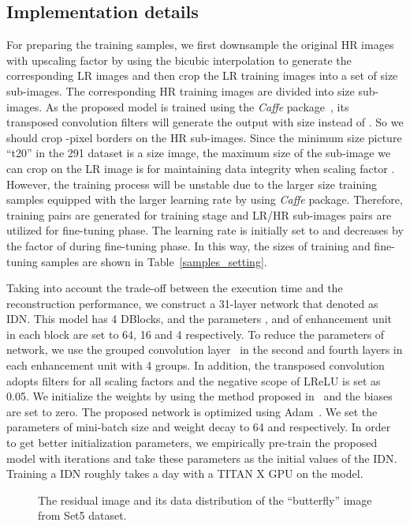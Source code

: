 \documentclass[10pt,twocolumn,letterpaper]{article}
\begin{document}
\subsection{Implementation details}
For preparing the training samples, we first downsample the original HR images with upscaling factor  by using the bicubic interpolation to generate the corresponding LR images and then crop the LR training images into a set of  size sub-images. The corresponding HR training images are divided into  size sub-images. As the proposed model is trained using the \emph{Caffe} package~\cite{Caffe}, its transposed convolution filters will generate the output with size  instead of . So we should crop -pixel borders on the HR sub-images. Since the minimum size picture ``t20'' in the 291 dataset is a  size image, the maximum size of the sub-image we can crop on the LR image is  for maintaining data integrity when scaling factor . However, the training process will be unstable due to the larger size training samples equipped with the larger learning rate by using \emph{Caffe} package. Therefore,  training pairs are generated for training stage and  LR/HR sub-images pairs are utilized for fine-tuning phase. The learning rate is initially set to  and decreases by the factor of  during fine-tuning phase. In this way, the sizes of training and fine-tuning samples are shown in Table~\ref{samples_setting}.

Taking into account the trade-off between the execution time and the reconstruction performance, we construct a 31-layer network that denoted as IDN. This model has 4 DBlocks, and the parameters ,  and  of enhancement unit in each block are set to 64, 16 and 4 respectively. To reduce the parameters of network, we use the grouped convolution layer~\cite{Xception,ResNeXt} in the second and fourth layers in each enhancement unit with 4 groups. In addition, the transposed convolution adopts  filters for all scaling factors and the negative scope of LReLU is set as 0.05. We initialize the weights by using the method proposed in~\cite{Msra} and the biases are set to zero. The proposed network is optimized using Adam~\cite{Adam}. We set the parameters of mini-batch size and weight decay to 64 and  respectively. In order to get better initialization parameters, we empirically pre-train the proposed model with  iterations and take these parameters as the initial values of the IDN. Training a IDN roughly takes a day with a TITAN X GPU on the  model.

\begin{figure}[htb]
	\centering
	\hfil
	\caption{The residual image and its data distribution of the ``butterfly'' image from Set5 dataset.}
	\label{fig:real_image}
\end{figure}
\end{document}
